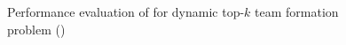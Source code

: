 \begin{figure}[t!]
\begin{center}
		\hspace{0.2ex}
		\vspace{-2ex}
		
	\end{center}
	\vspace{-3.0ex}
	\caption{Performance evaluation of \inc for dynamic top-$k$ team formation problem (\youtube)}
	\label{exp-inc-youtube}
	\vspace{-3.0ex}
\end{figure}
